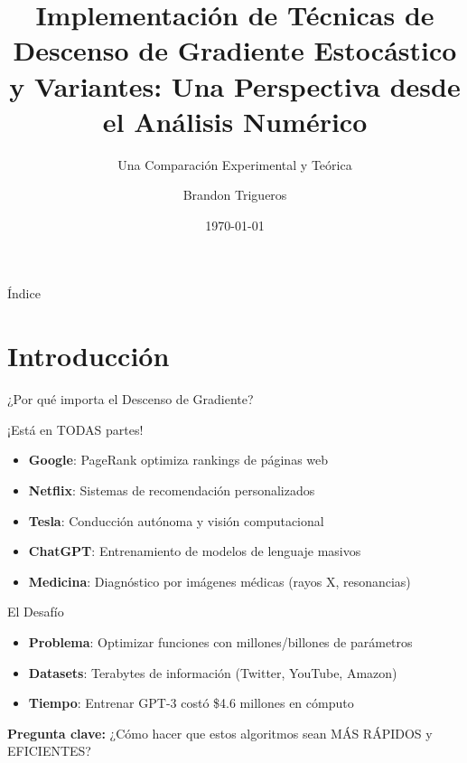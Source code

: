 \documentclass[10pt]{beamer}
\title[Optimizadores de Gradiente]{Implementación de Técnicas de Descenso de Gradiente Estocástico y Variantes: Una Perspectiva desde el Análisis Numérico}
\subtitle{Una Comparación Experimental y Teórica}
\author[Trigueros]{Brandon Trigueros}
\institute[Universidad de Costa Rica]{Curso de Análisis Numérico\\Facultad de Ingeniería\\Universidad de Costa Rica}
\date{\today}
\begin{document}
\begin{frame}
\titlepage
\end{frame}

\begin{frame}{Índice}
\tableofcontents
\end{frame}

\section{Introducción}

\begin{frame}{¿Por qué importa el Descenso de Gradiente?}
\begin{alertblock}{¡Está en TODAS partes!}
\begin{itemize}
\item \textbf{Google}: PageRank optimiza rankings de páginas web
\item \textbf{Netflix}: Sistemas de recomendación personalizados  
\item \textbf{Tesla}: Conducción autónoma y visión computacional
\item \textbf{ChatGPT}: Entrenamiento de modelos de lenguaje masivos
\item \textbf{Medicina}: Diagnóstico por imágenes médicas (rayos X, resonancias)
\end{itemize}
\end{alertblock}

\begin{block}{El Desafío}
\begin{itemize}
\item \textbf{Problema}: Optimizar funciones con millones/billones de parámetros
\item \textbf{Datasets}: Terabytes de información (Twitter, YouTube, Amazon)
\item \textbf{Tiempo}: Entrenar GPT-3 costó \$4.6 millones en cómputo
\end{itemize}
\end{block}

\vspace{0.3cm}
\textcolor{azulUni}{\textbf{Pregunta clave:}} ¿Cómo hacer que estos algoritmos sean MÁS RÁPIDOS y EFICIENTES?
\end{frame}
\end{document}
